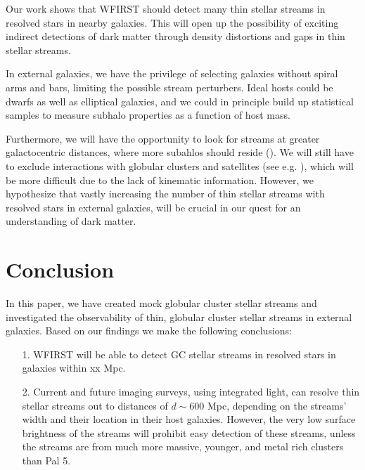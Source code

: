 \documentclass[twocolumn]{aastex62}
\begin{document}
Our work shows that WFIRST should detect many thin stellar streams in resolved stars in nearby galaxies. This will open up the possibility of exciting indirect detections of dark matter through density distortions and gaps in thin stellar streams. 

In external galaxies, we have the privilege of selecting galaxies without spiral arms and bars, limiting the possible stream perturbers. Ideal hosts could be dwarfs as well as elliptical galaxies, and we could in principle build up statistical samples to measure subhalo properties as a function of host mass. 

Furthermore, we will  have the opportunity to look for streams at greater galactocentric distances, where more subahlos should reside (\citealt{garrison17}). We will still have to exclude interactions with globular clusters and satellites (see e.g. \citealt{bonaca19}), which will be more difficult due to the lack of kinematic information. However, we hypothesize that vastly increasing the number of thin stellar streams with resolved stars in external galaxies, will be crucial in our quest for an understanding of dark matter. 

\section{Conclusion}\label{sec:conclusion}
In this paper, we have created mock globular cluster stellar streams and investigated the observability of thin, globular cluster stellar streams in external galaxies. Based on our findings we make the following conclusions:

\begin{itemize}
\item[1.]  WFIRST will be able to detect GC stellar streams in resolved stars in galaxies within xx Mpc.
\item[2.]  Current and future imaging surveys, using integrated light, can resolve thin stellar streams out to distances of $d \sim 600$ Mpc, depending on the streams' width and their location in their host galaxies. However, the very low surface brightness of the streams will prohibit easy detection of these streams, unless the streams are from much more massive, younger, and metal rich clusters than Pal 5. 
\end{itemize}
\end{document}
